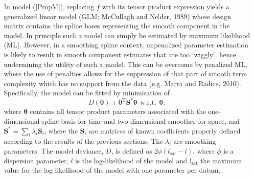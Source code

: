 In model (\ref{PropM}), replacing $f$ with its tensor product expression yields a generalized linear model (GLM; McCullagh and Nelder, 1989) whose design matrix contains the spline bases representing the smooth component in the model. In principle such a model can simply be estimated by maximum likelihood (ML). However, in a smoothing spline context, unpenalized parameter estimation is likely to result in smooth component estimates that are too `wiggly', hence undermining the utility of such a model. This can be overcome by penalized ML, where the use of penalties allows for the suppression of that part of smooth term complexity which has no support from the data (e.g. Marra and Radice, 2010). Specifically, the model can be fitted by minimisation of
\begin{equation}
D(\bm\theta) + \bm\theta^\text{T}\textbf{S}^*\bm\theta \ \  \text{w.r.t.} \ \  \bm\theta,
\label{Dev}
\end{equation}
where $\bm\theta$ contains all tensor product parameters associated with the one-dimensional spline basis for time and two-dimensional smoother for space, and $\textbf{S}^*=\sum_i \lambda_i \textbf{S}_i$, where the $\textbf{S}_i$ are matrices of known coefficients properly defined according to the results of the previous sections. The $\lambda_i$ are smoothing parameters. The model deviance, $D$, is defined as $2\phi(l_{\text{sat}}-l)$, where $\phi$ is a dispersion parameter, $l$ is the log-likelihood of the model and $l_{\text{sat}}$ the maximum value for the log-likelihood of the model with one parameter per datum. 

